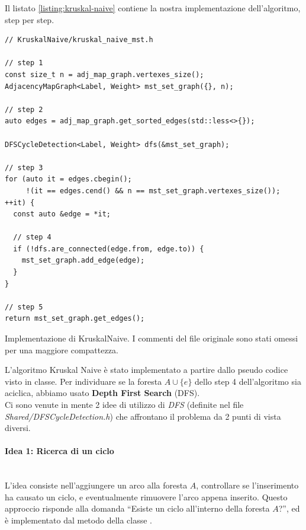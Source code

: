 \noindent Il listato \ref{listing:kruskal-naive} contiene la nostra implementazione dell'algoritmo, step per step.

\begin{listing}[!ht]
\begin{verbatim}
// KruskalNaive/kruskal_naive_mst.h

// step 1
const size_t n = adj_map_graph.vertexes_size();
AdjacencyMapGraph<Label, Weight> mst_set_graph({}, n);

// step 2
auto edges = adj_map_graph.get_sorted_edges(std::less<>{});

DFSCycleDetection<Label, Weight> dfs(&mst_set_graph);

// step 3
for (auto it = edges.cbegin();
     !(it == edges.cend() && n == mst_set_graph.vertexes_size()); ++it) {
  const auto &edge = *it;

  // step 4
  if (!dfs.are_connected(edge.from, edge.to)) {
    mst_set_graph.add_edge(edge);
  }
}

// step 5
return mst_set_graph.get_edges();
\end{verbatim}
\caption{Implementazione di KruskalNaive. I commenti del file originale sono stati omessi per una maggiore compattezza.}
\label{listing:kruskal-naive}
\end{listing}

\noindent L'algoritmo Kruskal Naive è stato implementato a partire dallo pseudo codice visto in classe. Per individuare se la foresta $A \cup \{ e \}$ dello step 4 dell'algoritmo sia aciclica, abbiamo usato \textbf{Depth First Search} (DFS). \\

\noindent Ci sono venute in mente 2 idee di utilizzo di \textit{DFS} (definite nel file \textit{Shared/DFSCycleDetection.h}) che affrontano il problema da 2 punti di vista diversi.

\paragraph{Idea 1: Ricerca di un ciclo}\mbox{} \\

\noindent L'idea consiste nell'aggiungere un arco alla foresta $A$, controllare se l'inserimento ha causato un ciclo, e eventualmente rimuovere l'arco appena inserito. Questo approccio risponde alla domanda ``Esiste un ciclo all'interno della foresta $A$?'', ed è implementato dal metodo  della classe .


